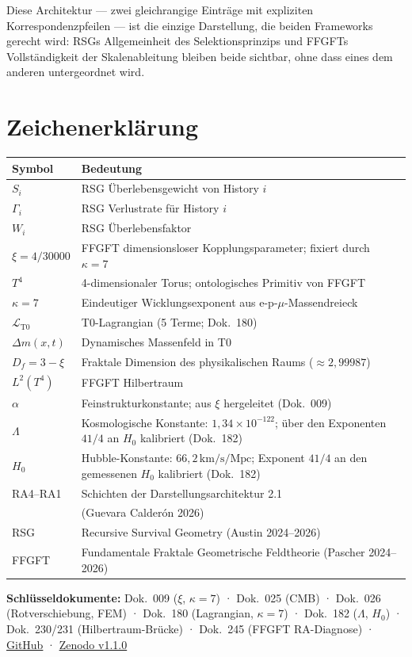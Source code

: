 Diese Architektur — zwei gleichrangige Einträge mit expliziten
Korrespondenzpfeilen — ist die einzige Darstellung, die beiden Frameworks
gerecht wird: RSGs Allgemeinheit des Selektionsprinzips und FFGFTs
Vollständigkeit der Skalenableitung bleiben beide sichtbar, ohne dass
eines dem anderen untergeordnet wird.

\section{Zeichenerklärung}

{\small
\begin{tabular}{p{3cm}p{10.5cm}}
\toprule
\textbf{Symbol} & \textbf{Bedeutung} \\
\midrule
$S_i$ & RSG Überlebensgewicht von History $i$ \\
$\Gamma_i$ & RSG Verlustrate für History $i$ \\
$W_i$ & RSG Überlebensfaktor \\
$\xi = 4/30000$ & FFGFT dimensionsloser Kopplungsparameter; fixiert durch $\kappa=7$ \\
$T^4$ & 4-dimensionaler Torus; ontologisches Primitiv von FFGFT \\
$\kappa = 7$ & Eindeutiger Wicklungsexponent aus e-p-$\mu$-Massendreieck \\
$\mathcal{L}_{\text{T0}}$ & T0-Lagrangian (5 Terme; Dok.~180) \\
$\Delta m(x,t)$ & Dynamisches Massenfeld in T0 \\
$D_f = 3-\xi$ & Fraktale Dimension des physikalischen Raums ($\approx 2{,}99987$) \\
$L^2(T^4)$ & FFGFT Hilbertraum \\
$\alpha$ & Feinstrukturkonstante; aus $\xi$ hergeleitet (Dok.~009) \\
$\Lambda$ & Kosmologische Konstante: $1{,}34\times10^{-122}$; über den Exponenten $41/4$ an $H_0$ kalibriert (Dok.~182) \\
$H_0$ & Hubble-Konstante: $66{,}2\,\text{km/s/Mpc}$; Exponent $41/4$ an den gemessenen $H_0$ kalibriert (Dok.~182) \\
RA4--RA1 & Schichten der Darstellungsarchitektur 2.1\\
          & \quad (Guevara Calderón 2026) \\
RSG & Recursive Survival Geometry (Austin 2024--2026) \\
FFGFT & Fundamentale Fraktale Geometrische Feldtheorie (Pascher 2024--2026) \\
\bottomrule
\end{tabular}
}

\vspace{1em}
\noindent\textbf{Schlüsseldokumente:}
Dok.~009 ($\xi$, $\kappa=7$) ·
Dok.~025 (CMB) ·
Dok.~026 (Rotverschiebung, FEM) ·
Dok.~180 (Lagrangian, $\kappa=7$) ·
Dok.~182 ($\Lambda$, $H_0$) ·
Dok.~230/231 (Hilbertraum-Brücke) ·
Dok.~245 (FFGFT RA-Diagnose) ·
\href{https://github.com/jpascher/T0-Time-Mass-Duality}{GitHub} ·
\href{https://doi.org/10.5281/zenodo.20117635}{Zenodo v1.1.0}
